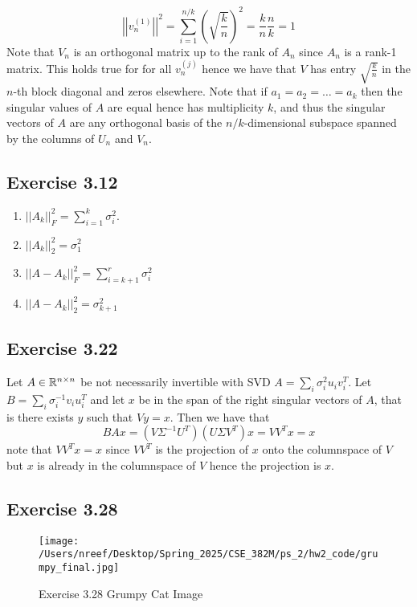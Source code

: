 \documentclass[12pt]{report}
\newcommand{\norm}[1]{\left|\left|#1\right|\right|}
\begin{document}
\begin{equation*}
  \norm{v_n^{(1)}}^2 = \sum_{i=1}^{n/k} \left(\sqrt{\frac{k}{n}}\right)^2= \frac{k}{n} \frac{n}{k}  = 1
\end{equation*}
Note that $V_n$ is an orthogonal matrix up to the rank of $A_n$ since $A_n$ is a rank-1 matrix. This holds true for for all $v_n^{(j)}$ hence we have that $V$ has entry $\sqrt{\frac{k}{n}}$ in the $n$-th block diagonal and zeros elsewhere. Note that if $a_1 = a_2 = \dots = a_k$ then the singular values of $A$ are equal hence has multiplicity $k$, and thus the singular vectors of $A$ are any orthogonal basis of the $n/k$-dimensional subspace spanned by the columns of $U_n$ and $V_n$.

\subsection*{Exercise 3.12}
\begin{enumerate}
  \item $\norm{A_k}_F^2 = \sum_{i=1}^k \sigma_i^2$. 
  \item $\norm{A_k}_2^2 = \sigma_1^2$
  \item $\norm{A-A_k}_F^2 = \sum_{i=k+1}^r \sigma_i^2$
  \item $\norm{A-A_k}_2^2 = \sigma_{k+1}^2$
\end{enumerate}

\subsection*{Exercise 3.22}
Let $A \in \mathbb{R}^{n \times n}$ be not necessarily invertible with SVD $A = \sum_{i}\sigma_i^2 u_iv_i^T$. Let $B = \sum_{i}\sigma_i^{-1}v_iu_i^T$ and let $x$ be in the span of the right singular vectors of $A$, that is there exists $y$ such that $Vy = x$. Then we have that
\begin{equation*}
  BAx = (V\Sigma^{-1} U^T)(U\Sigma V^T)x = VV^Tx = x
\end{equation*}
note that $VV^Tx = x$ since $VV^T$ is the projection of $x$ onto the columnspace of $V$ but $x$ is already in the columnspace of $V$ hence the projection is $x$. 

\subsection*{Exercise 3.28}
\begin{figure}[H]
  \centering
  \texttt{[image: /Users/nreef/Desktop/Spring\_2025/CSE\_382M/ps\_2/hw2\_code/grumpy\_final.jpg]}
  \caption{Exercise 3.28 Grumpy Cat Image}
\end{figure}
\end{document}
